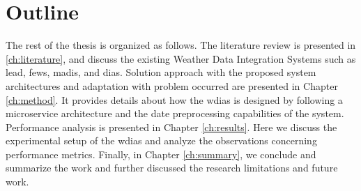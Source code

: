 \section{Outline}
The rest of the thesis is organized as follows. The literature review is presented in \cref{ch:literature}, and discuss the existing Weather Data Integration Systems such as \acrshort{lead}, \acrshort{fews}, \acrshort{madis}, and \acrshort{dias}. Solution approach with the proposed system architectures and adaptation with problem occurred are presented in Chapter \ref{ch:method}. It provides details about how the \acrshort{wdias} is designed by following a microservice architecture and the date preprocessing capabilities of the system. Performance analysis is presented in Chapter \ref{ch:results}. Here we discuss the experimental setup of the \acrshort{wdias} and analyze the observations concerning performance metrics. Finally, in Chapter \ref{ch:summary}, we conclude and summarize the work and further discussed the research limitations and future work.
